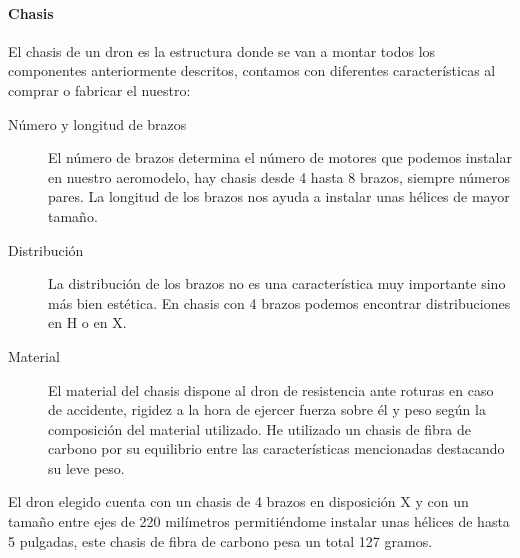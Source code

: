 
\paragraph{Chasis}
\label{SSS:Chasis}

	El chasis de un dron es la estructura donde se van a montar todos los componentes anteriormente descritos, contamos con diferentes características al comprar o fabricar el nuestro:
	
	\begin{description}
	\item[Número y longitud de brazos] El número de brazos determina el número de motores que podemos instalar en nuestro aeromodelo, hay chasis desde 4 hasta 8 brazos, siempre números pares.
	La longitud de los brazos nos ayuda a instalar unas hélices de mayor tamaño.
	\item[Distribución] La distribución de los brazos no es una característica muy importante sino más bien estética. En chasis con 4 brazos podemos encontrar distribuciones en H o en X.
%	
%  
	\item[Material]
	El material del chasis dispone al dron de resistencia ante roturas en caso de accidente, rigidez a la hora de ejercer fuerza sobre él y peso según la composición del material utilizado.
	He utilizado un chasis de fibra de carbono por su equilibrio entre las características mencionadas destacando su leve peso.
	\end{description}
	
		
	El dron elegido cuenta con un chasis de 4 brazos en disposición X y con un tamaño entre ejes de 220 milímetros permitiéndome instalar unas hélices de hasta 5 pulgadas, este chasis de fibra de carbono pesa un total 127 gramos.
		

